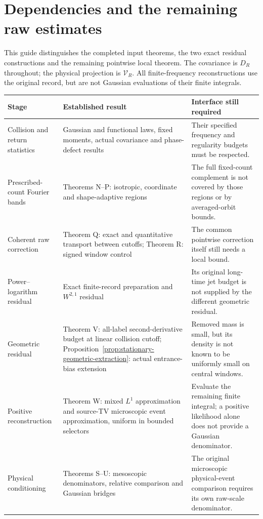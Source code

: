 \section{Dependencies and the remaining raw estimates}
\label{app:dependency-guide}
This guide distinguishes the completed input theorems, the two exact
residual constructions and the remaining pointwise local theorem.
The covariance is $D_R$ throughout; the physical projection is
$\mathcal V_R$. All finite-frequency reconstructions use the original
record, but are not Gaussian evaluations of their finite integrals.

\begin{center}
\small
\renewcommand{\arraystretch}{1.2}
\begin{tabular}{@{}p{}p{}p{}@{}}
\hline
Stage & Established result & Interface still required\\
\hline
Collision and return statistics & Gaussian and functional laws,
fixed moments, actual covariance and phase-defect results & Their
specified frequency and regularity budgets must be respected.\\
Prescribed-count Fourier bands & Theorems N--P: isotropic, coordinate
and shape-adaptive regions & The full fixed-count complement is not
covered by those regions or by averaged-orbit bounds.\\
Coherent raw correction & Theorem Q: exact and quantitative transport
between cutoffs; Theorem R: signed window control & The common
pointwise correction itself still needs a local bound.\\
Power--logarithm residual & Exact finite-record preparation and
$W^{2,1}$ residual & Its original long-time jet budget is not supplied
by the different geometric residual.\\
Geometric residual & Theorem V: all-label second-derivative budget
at linear collision cutoff; Proposition~\ref{prop:stationary-geometric-extraction}:
actual entrance-bias extension & Removed mass is small, but its density
is not known to be uniformly small on central windows.\\
Positive reconstruction & Theorem W: mixed $L^1$ approximation and
source-TV microscopic event approximation, uniform in bounded selectors
& Evaluate the remaining finite integral; a positive likelihood alone
does not provide a Gaussian denominator.\\
Physical conditioning & Theorems S--U: mesoscopic denominators,
relative comparison and Gaussian bridges & The original microscopic
physical-event comparison requires its own raw-scale denominator.\\
\hline
\end{tabular}
\end{center}

